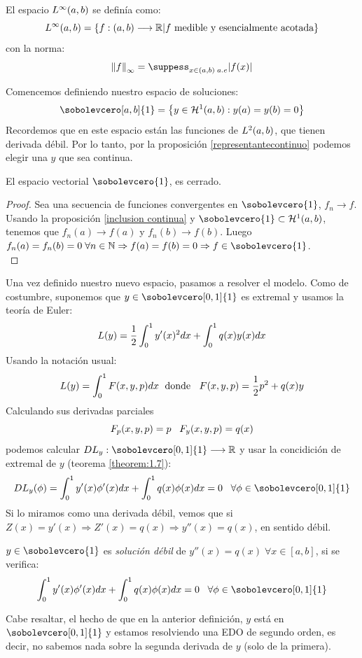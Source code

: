 \begin{remark}
El espacio $L^{ \infty }(a,b)$ se definía como:
\[
L^{ \infty }(a,b)=\{f : (a,b) \longrightarrow \mathbb{R}|f\text{ medible y esencialmente acotada}\}
\]
con la norma:
\[
\norm{f}_\infty = \suppess_{x\in(a,b)\;a.e}|f(x)|
\]
\end{remark}

Comencemos definiendo nuestro espacio de soluciones:
\[
\sobolevcero[a,b]{1}=\conjunto{y\in\sobolev{1}: y(a)=y(b)=0}
\]
Recordemos que en este espacio están las funciones de $L^{ 2 }(a,b)$, que tienen derivada débil. Por lo tanto, por la proposición \ref{representantecontinuo} podemos elegir una $y$ que sea continua.
\begin{prop}
El espacio vectorial $\sobolevcero{1}$, es cerrado.
\end{prop}   
\begin{proof}
Sea una secuencia de funciones convergentes en $\sobolevcero{1}$, $f_n\longrightarrow f$. Usando la proposición \ref{inclusion continua} y $\sobolevcero{1}\subset\sobolev{1}$, tenemos que $f_n(a)\longrightarrow f(a)$ y $f_n(b)\longrightarrow f(b)$. Luego $f_n(a)=f_n(b)=0 \;\forall n\in\N \Rightarrow f(a)=f(b)=0 \Rightarrow f\in\sobolevcero{1}$.\\
\end{proof}

Una vez definido nuestro nuevo espacio, pasamos a resolver el modelo. Como de costumbre, suponemos que $y\in\sobolevcero[0,1]{1}$ es extremal y usamos la teoría de Euler:
\[
L(y)=\frac{1}{2}\displaystyle\int_{ 0 }^{ 1 } y'(x)^2dx+\displaystyle\int_{ 0 }^{ 1 } q(x)y(x)dx
\]
Usando la notación usual:
\[
L(y)=\displaystyle\int_{ 0 }^{ 1 } F(x,y,p)dx \; \text{ donde } \;\; F(x,y,p)=\frac{1}{2}p^2+q(x)y
\]
Calculando sus derivadas parciales
\[
F_p(x,y,p)=p \;\;\; F_y(x,y,p)=q(x)
\]
podemos calcular $\funcion{DL_y}{\sobolevcero[0,1]{1}}{\R}$ y usar la concidición de extremal de $y$ (teorema \ref{theorem:1.7}):
\[
DL_y(\phi)=\integral{0}{1}{y'(x)\phi'(x)dx}+\integral{0}{1}{q(x)\phi(x)dx}=0 \espacio \forall \phi\in\sobolevcero[0,1]{1}
\]
Si lo miramos como una derivada débil, vemos que si $Z(x)=y'(x) \Rightarrow Z'(x)=q(x) \Rightarrow y''(x)=q(x)$, en sentido débil.
\begin{definition}
\label{soluciondebil}
$y\in\sobolevcero{1}$ es \textit{solución débil} de $y''(x)=q(x) \; \forall x 
\in [a,b]$, si se verifica:
\[
\integral{0}{1}{y'(x)\phi'(x)dx}+\integral{0}{1}{q(x)\phi(x)dx}=0 \espacio \forall \phi\in\sobolevcero[0,1]{1}
\]
\end{definition}
Cabe resaltar, el hecho de que en la anterior definición, $y$ está en $\sobolevcero[0,1]{1}$ y estamos resolviendo una EDO de segundo orden, es decir, no sabemos nada sobre la segunda derivada de $y$ (solo de la primera).


